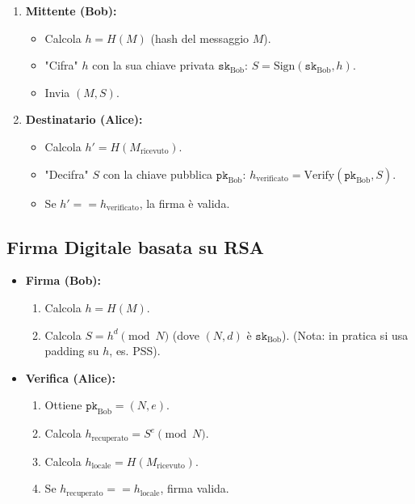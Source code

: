 \begin{enumerate}
    \item \textbf{Mittente (Bob):}
    \begin{itemize}
        \item Calcola $h = H(M)$ (hash del messaggio $M$).
        \item "Cifra" $h$ con la sua chiave privata $\texttt{sk}_{\text{Bob}}$: $S = \text{Sign}(\texttt{sk}_{\text{Bob}}, h)$.
        \item Invia $(M, S)$.
    \end{itemize}
    \item \textbf{Destinatario (Alice):}
    \begin{itemize}
        \item Calcola $h' = H(M_{\text{ricevuto}})$.
        \item "Decifra" $S$ con la chiave pubblica $\texttt{pk}_{\text{Bob}}$: $h_{\text{verificato}} = \text{Verify}(\texttt{pk}_{\text{Bob}}, S)$.
        \item Se $h' == h_{\text{verificato}}$, la firma è valida.
    \end{itemize}
\end{enumerate}

\subsection{Firma Digitale basata su RSA}
\begin{itemize}
    \item \textbf{Firma (Bob):}
    \begin{enumerate}
        \item Calcola $h = H(M)$.
        \item Calcola $S = h^d \pmod N$ (dove $(N,d)$ è $\texttt{sk}_{\text{Bob}}$).
        (Nota: in pratica si usa padding su $h$, es. PSS).
    \end{enumerate}
    \item \textbf{Verifica (Alice):}
    \begin{enumerate}
        \item Ottiene $\texttt{pk}_{\text{Bob}} = (N,e)$.
        \item Calcola $h_{\text{recuperato}} = S^e \pmod N$.
        \item Calcola $h_{\text{locale}} = H(M_{\text{ricevuto}})$.
        \item Se $h_{\text{recuperato}} == h_{\text{locale}}$, firma valida.
    \end{enumerate}
\end{itemize}

